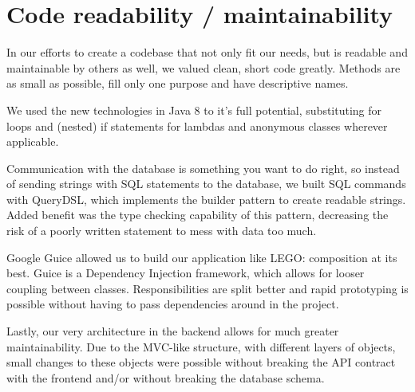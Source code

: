 \section{Code readability / maintainability}
In our efforts to create a codebase that not only fit our needs, but is readable and maintainable by others as well, we valued clean, short code greatly. Methods are as small as possible, fill only one purpose and have descriptive names. 

We used the new technologies in Java 8 to it's full potential, substituting for loops and (nested) if statements for lambdas and anonymous classes wherever applicable.

Communication with the database is something you want to do right, so instead of sending strings with SQL statements to the database, we built SQL commands with QueryDSL, which implements the builder pattern to create readable strings. Added benefit was the type checking capability of this pattern, decreasing the risk of a poorly written statement to mess with data too much.

Google Guice allowed us to build our application like LEGO: composition at its best. Guice is a Dependency Injection framework, which allows for looser coupling between classes. Responsibilities are split better and rapid prototyping is possible without having to pass dependencies around in the project.

Lastly, our very architecture in the backend allows for much greater maintainability. Due to the MVC-like structure, with different layers of objects, small changes to these objects were possible without breaking the API contract with the frontend and/or without breaking the database schema. 

